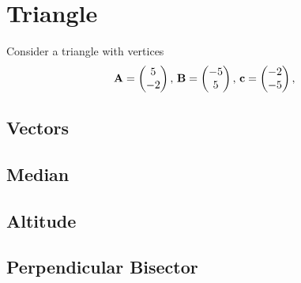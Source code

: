 \documentclass[11pt]{book}
\begin{document}
\frontmatter
\tableofcontents
\setcounter{page}{1}
\mainmatter
\chapter{Triangle}
Consider a triangle with vertices
\begin{align}
\label{eq:tri-pts}
\vec{A}=\myvec{5 \\ -2},\,
\vec{B}=\myvec{-5\\5},\,
	\vec{c}=\myvec{-2\\-5},\,
\end{align}

\section{Vectors}
\section{Median}
\section{Altitude}
\section{Perpendicular Bisector}
\end{document}
